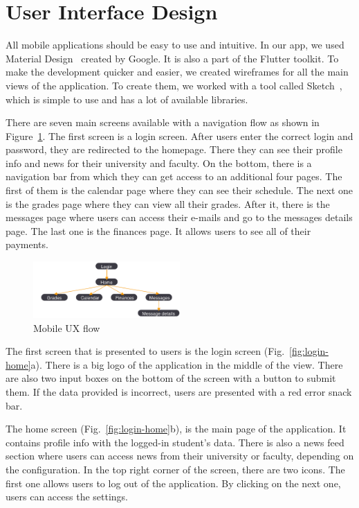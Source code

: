 \section{User Interface Design}

All mobile applications should be easy to use and intuitive. In our app, we used Material Design~\cite{material-design} created by Google. It is also a part of the Flutter toolkit. To make the development quicker and easier, we created wireframes for all the main views of the application. To create them, we worked with a tool called Sketch~\cite{sketch}, which is simple to use and has a lot of available libraries.

There are seven main screens available with a navigation flow as shown in Figure~\ref{fig:ux-flow}. The first screen is a login screen. After users enter the correct login and password, they are redirected to the homepage. There they can see their profile info and news for their university and faculty. On the bottom, there is a navigation bar from which they can get access to an additional four pages. The first of them is the calendar page where they can see their schedule. The next one is the grades page where they can view all their grades. After it, there is the messages page where users can access their e-mails and go to the messages details page. The last one is the finances page. It allows users to see all of their payments.

\begin{figure}[htb]
    \centering
    \includegraphics[width=0.5\textwidth]{fig03/mobile_ux_flow.png}
    \caption{Mobile UX flow}
    \label{fig:ux-flow}
\end{figure}

The first screen that is presented to users is the login screen (Fig.~\ref{fig:login-home}a). There is a big logo of the application in the middle of the view. There are also two input boxes on the bottom of the screen with a button to submit them. If the data provided is incorrect, users are presented with a red error snack bar.

The home screen (Fig.~\ref{fig:login-home}b), is the main page of the application. It contains profile info with the logged-in student's data. There is also a news feed section where users can access news from their university or faculty, depending on the configuration. In the top right corner of the screen, there are two icons. The first one allows users to log out of the application. By clicking on the next one, users can access the settings.

